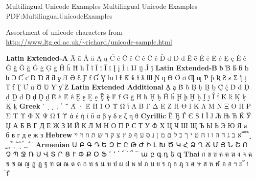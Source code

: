 \documentclass[letterpaper,MMMyyyy,nonstopmode]{simpleresumecv}
\begin{document}
\iffalse
    \Section
    {References}
    {References}
    {PDF:References}
    \Entry
    Character References available upon request

	\BulletItem
	\textbf{Professor Jonathan Public}
	\newline
	Professor of Geology and Mechanical Engineering
	\newline
	First American University
	\newline
	1000 First Avenue, Springfield, Massachusetts 22222, USA
	\newline
	\href{mailto:jonathanpublic@example.com}
	{jonathanpublic@example.com}
	\,\SubBulletSymbol\,
	+1\,(555)\,222-2222
	
	\BigGap
	\BulletItem
	\textbf{Dr Alice Bob Carol}
	\newline
	Director, Research \& Development
	\newline
	Alpha Engineering Firm
	\newline
	20 North Street, Oakland, Ohio 33333, USA
	\newline
	\href{mailto:alicebobcarol@example.com}
	{alicebobcarol@example.com}
	\,\SubBulletSymbol\,
	+1\,(555)\,333-3333
\fi


\iffalse
	\Section
	{Multilingual Unicode Examples}
	{Multilingual Unicode Examples}
	{PDF:MultilingualUnicodeExamples}
	
	\BulletItem
	Assortment of unicode characters from
	\href{http://www.ltg.ed.ac.uk/~richard/unicode-sample.html}
	{\url{http://www.ltg.ed.ac.uk/~richard/unicode-sample.html}}
	
	\begin{Detail}
	\Item
	\textbf{Latin Extended-A}
	Ā ā Ă ă Ą ą Ć ć Ĉ ĉ Ċ ċ Č č Ď ď Đ đ Ē ē Ĕ ĕ Ė ė Ę ę Ě ě Ĝ ĝ Ğ ğ Ġ ġ Ģ ģ Ĥ ĥ Ħ ħ Ĩ ĩ Ī ī Ĭ ĭ Į į İ ı Ĳ ĳ Ĵ ĵ
	\textbf{Latin Extended-B}
	ƀ Ɓ Ƃ ƃ Ƅ ƅ Ɔ Ƈ ƈ Ɖ Ɗ Ƌ ƌ ƍ Ǝ Ə Ɛ Ƒ ƒ Ɠ Ɣ ƕ Ɩ Ɨ Ƙ ƙ ƚ ƛ Ɯ Ɲ ƞ Ɵ Ơ ơ Ƣ ƣ Ƥ ƥ Ʀ Ƨ ƨ Ʃ ƪ ƫ Ƭ ƭ Ʈ Ư ư Ʊ Ʋ Ƴ ƴ Ƶ
	\textbf{Latin Extended Additional}
	Ḁ ḁ Ḃ ḃ Ḅ ḅ Ḇ ḇ Ḉ ḉ Ḋ ḋ Ḍ ḍ Ḏ ḏ Ḑ ḑ Ḓ ḓ Ḕ ḕ Ḗ ḗ Ḙ ḙ Ḛ ḛ Ḝ ḝ Ḟ ḟ Ḡ ḡ Ḣ ḣ Ḥ ḥ Ḧ ḧ Ḩ ḩ Ḫ ḫ Ḭ ḭ Ḯ ḯ Ḱ ḱ Ḳ ḳ Ḵ ḵ
	\textbf{Greek}
	ʹ ͵ ͺ ; ΄ ΅ Ά · Έ Ή Ί Ό Ύ Ώ ΐ Α Β Γ Δ Ε Ζ Η Θ Ι Κ Λ Μ Ν Ξ Ο Π Ρ Σ Τ Υ Φ Χ Ψ Ω Ϊ Ϋ ά έ ή ί ΰ α β γ δ ε ζ η θ
	\textbf{Cyrillic}
	Ё Ђ Ѓ Є Ѕ І Ї Ј Љ Њ Ћ Ќ Ў Џ А Б В Г Д Е Ж З И Й К Л М Н О П Р С Т У Ф Х Ц Ч Ш Щ Ъ Ы Ь Э Ю Я а б в г д е ж з
	\textbf{Hebrew}
א ב ג ד ה ו ז ח ט י ך כ ל ם מ ן נ ס ע ף פ ץ צ ק ר ש ת װ ױ ײ ֝ ֞ ֟ ֠ ֡ ֣ ֤ ֥ ֦ ֧ ֨ ֩ ֪ ֫ ֬ ֭ ֮ ֯ ְ ֱ ֒ ֓ ֔	
	\textbf{Armenian}
	{\UseSecondaryFont
	Ա Բ Գ Դ Ե Զ Է Ը Թ Ժ Ի Լ Խ Ծ Կ Հ Ձ Ղ Ճ Մ Յ Ն Շ Ո Չ Պ Ջ Ռ Ս Վ Տ Ր Ց Ւ Փ Ք Օ Ֆ ՙ ՚ ՛ ՜ ՝ ՞ ՟ ա բ գ դ ե զ}
	\textbf{Thai}
	{\UseSecondaryFont
	ก ข ฃ ค ฅ ฆ ง จ ฉ ช ซ ฌ ญ ฎ ฏ ฐ ฑ ฒ ณ ด ต ถ ท ธ น บ ป ผ ฝ พ ฟ ภ ม ย ร ฤ ล ฦ ว ศ ษ ส ห ฬ อ ฮ ฯ ะ ั า ำ ิ}
	\end{Detail}
	
\end{document}
